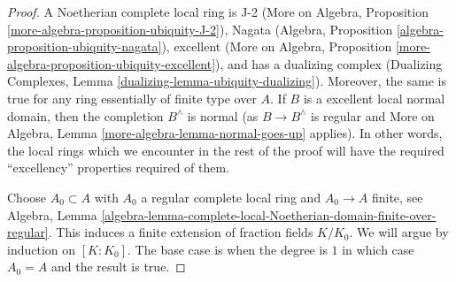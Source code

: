 \begin{proof}

A Noetherian complete local ring is J-2
(More on Algebra, Proposition \ref{more-algebra-proposition-ubiquity-J-2}),
Nagata (Algebra, Proposition \ref{algebra-proposition-ubiquity-nagata}),
excellent (More on Algebra, Proposition
\ref{more-algebra-proposition-ubiquity-excellent}),
and has a dualizing complex
(Dualizing Complexes, Lemma \ref{dualizing-lemma-ubiquity-dualizing}).
Moreover, the same is true for any ring essentially of finite type over $A$.
If $B$ is a excellent local normal domain, then the completion
$B^\wedge$ is normal (as $B \to B^\wedge$ is regular and
More on Algebra, Lemma \ref{more-algebra-lemma-normal-goes-up} applies).
In other words, the local rings which we encounter in the rest of the proof
will have the required ``excellency'' properties required of them.

\medskip\noindent
Choose $A_0 \subset A$ with $A_0$ a regular complete local ring
and $A_0 \to A$ finite, see Algebra, Lemma
\ref{algebra-lemma-complete-local-Noetherian-domain-finite-over-regular}.
This induces a finite extension of fraction fields $K/K_0$.
We will argue by induction on $[K : K_0]$. The base case is
when the degree is $1$ in which case $A_0 = A$ and the result is true.


\end{proof}
